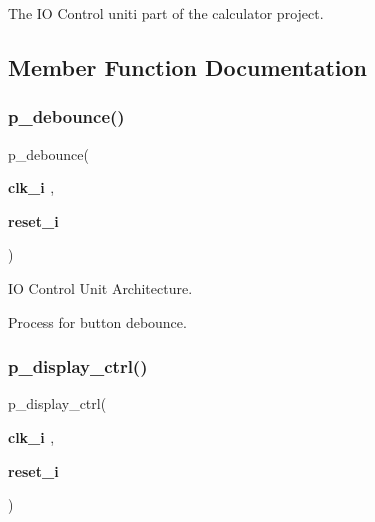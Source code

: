 The IO Control uniti part of the calculator project. 

\subsection{Member Function Documentation}
\mbox{\label{classio__ctrl_1_1rtl_a627aed9352c04ffc84d1b682c4da9ba5}} 
\subsubsection{\texorpdfstring{p\+\_\+debounce()}{p\_debounce()}}
{\footnotesize\ttfamily  {\bfseries \textcolor{vhdlchar}{ }} p\+\_\+debounce(\begin{DoxyParamCaption}\item[{}]{{\bfseries \textcolor{vhdlchar}{clk\+\_\+i}\textcolor{vhdlchar}{ }} {\em } ,  }\item[{}]{{\bfseries \textcolor{vhdlchar}{reset\+\_\+i}\textcolor{vhdlchar}{ }} {\em } }\end{DoxyParamCaption})\hspace{0.3cm}{\ttfamily [Process]}}



IO Control Unit Architecture. 

Process for button debounce. \mbox{\label{classio__ctrl_1_1rtl_a9adae6696d8563868e95204ecd77e739}} 
\subsubsection{\texorpdfstring{p\+\_\+display\+\_\+ctrl()}{p\_display\_ctrl()}}
{\footnotesize\ttfamily  {\bfseries \textcolor{vhdlchar}{ }} p\+\_\+display\+\_\+ctrl(\begin{DoxyParamCaption}\item[{}]{{\bfseries \textcolor{vhdlchar}{clk\+\_\+i}\textcolor{vhdlchar}{ }} {\em } ,  }\item[{}]{{\bfseries \textcolor{vhdlchar}{reset\+\_\+i}\textcolor{vhdlchar}{ }} {\em } }\end{DoxyParamCaption})\hspace{0.3cm}{\ttfamily [Process]}}



